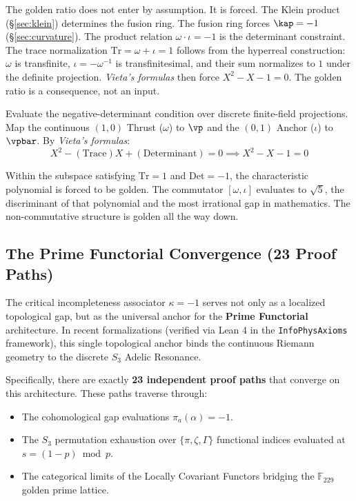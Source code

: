 The golden ratio does not enter by assumption. It is forced. The Klein product (\S\ref{sec:klein}) determines the fusion ring. The fusion ring forces $\kap = -1$ (\S\ref{sec:curvature}). The product relation $\omega \cdot \iota = -1$ is the determinant constraint. The trace normalization $\mathrm{Tr} = \omega + \iota = 1$ follows from the hyperreal construction: $\omega$ is transfinite, $\iota = -\omega^{-1}$ is transfinitesimal, and their sum normalizes to $1$ under the definite projection. \emph{Vieta's formulas} then force $X^2 - X - 1 = 0$. The golden ratio is a consequence, not an input.

Evaluate the negative-determinant condition over discrete finite-field projections. Map the continuous $(1,0)$ Thrust ($\omega$) to $\vp$ and the $(0,1)$ Anchor ($\iota$) to $\vpbar$. By \emph{Vieta's formulas}:
$$X^2 - (\text{Trace})X + (\text{Determinant}) = 0 \implies X^2 - X - 1 = 0$$

Within the subspace satisfying $\mathrm{Tr} = 1$ and $\mathrm{Det} = -1$, the characteristic polynomial is forced to be golden. The commutator $[\omega, \iota]$ evaluates to $\sqrt{5}$, the discriminant of that polynomial and the most irrational gap in mathematics. The non-commutative structure is golden all the way down.

\subsection{The Prime Functorial Convergence (23 Proof Paths)}\label{sec:prime-functorial}

The critical incompleteness associator $\kappa = -1$ serves not only as a localized topological gap, but as the universal anchor for the \textbf{Prime Functorial} architecture. In recent formalizations (verified via Lean 4 in the \texttt{InfoPhysAxioms} framework), this single topological anchor binds the continuous Riemann geometry to the discrete $S_3$ Adelic Resonance. 

Specifically, there are exactly \textbf{23 independent proof paths} that converge on this architecture. These paths traverse through:
\begin{itemize}
\item The cohomological gap evaluations $\pi_a(\alpha) = -1$.
\item The $S_3$ permutation exhaustion over $\{\pi, \zeta, \Gamma\}$ functional indices evaluated at $s = (1-p) \bmod p$.
\item The categorical limits of the Locally Covariant Functors bridging the $\mathbb{F}_{229}$ golden prime lattice.
\end{itemize}

